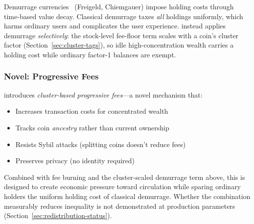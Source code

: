 Demurrage currencies~\cite{gesell} (Freigeld, Chiemgauer) impose holding costs
through time-based value decay. Classical demurrage taxes \emph{all} holdings
uniformly, which harms ordinary users and complicates the user experience.
\Botho instead applies demurrage \emph{selectively}: the stock-level fee-floor
term scales with a coin's cluster factor (Section~\ref{sec:cluster-tags}), so
idle high-concentration wealth carries a holding cost while ordinary
factor-1 balances are exempt.

\subsubsection{Novel: Progressive Fees}

\Botho introduces \textit{cluster-based progressive fees}---a novel
mechanism that:
\begin{itemize}
  \item Increases transaction costs for concentrated wealth
  \item Tracks coin \textit{ancestry} rather than current ownership
  \item Resists Sybil attacks (splitting coins doesn't reduce fees)
  \item Preserves privacy (no identity required)
\end{itemize}

Combined with fee burning and the cluster-scaled demurrage term above, this
is designed to create economic pressure toward circulation while sparing
ordinary holders the uniform holding cost of classical demurrage. Whether the
combination measurably reduces inequality is not demonstrated at production
parameters (Section~\ref{sec:redistribution-status}).

